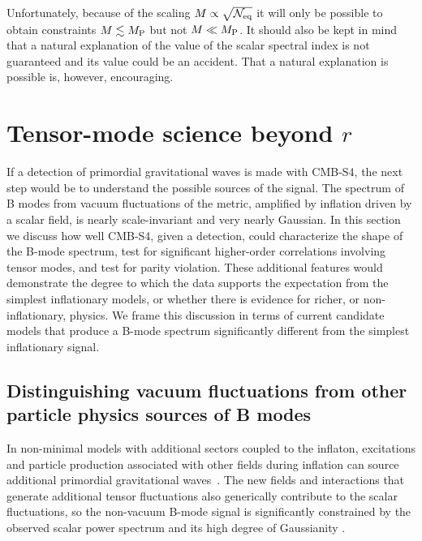 Unfortunately, because of the scaling $M\propto \sqrt{\mathcal{N}_{\rm eq}}$ it will only be possible to obtain constraints $M\lesssim M_{\rm P}$ but not $M\ll M_{\rm P}$. It should also be kept in mind that a natural explanation of the value of the scalar spectral index is not guaranteed and its value could be an accident. That a natural explanation is possible is, however, encouraging.

\section{Tensor-mode science beyond $r$}
\label{sec:beyond_r}

If a detection of primordial gravitational waves is made with CMB-S4, the next step would be to understand the possible sources of the signal. The spectrum of B modes from vacuum fluctuations of the metric, amplified by inflation driven by a scalar field, is nearly scale-invariant and very nearly Gaussian. In this section we discuss how well CMB-S4, given a detection, could characterize the shape of the B-mode spectrum, test for significant higher-order correlations involving tensor modes, and test for parity violation. These additional features would demonstrate the degree to which the data supports the expectation from the simplest inflationary models, or whether there is evidence for richer, or non-inflationary, physics. We frame this discussion in terms of current candidate models that produce a B-mode spectrum significantly different from the simplest inflationary signal.  

\subsection{Distinguishing vacuum fluctuations from other particle physics sources of B modes}
In non-minimal models with additional sectors coupled to the inflaton, excitations and particle production associated with other fields during inflation can source additional primordial gravitational waves~\cite{Cook:2011hg,Senatore:2011sp,Barnaby:2012xt}. The new fields and interactions that generate additional tensor fluctuations also generically contribute to the scalar fluctuations, so the non-vacuum B-mode signal is significantly constrained by the observed scalar power spectrum and its high degree of Gaussianity \cite{Barnaby:2012xt,Meerburg:2012id,Ferreira:2014zia,Mirbabayi:2014jqa,Ozsoy:2014sba}. 

